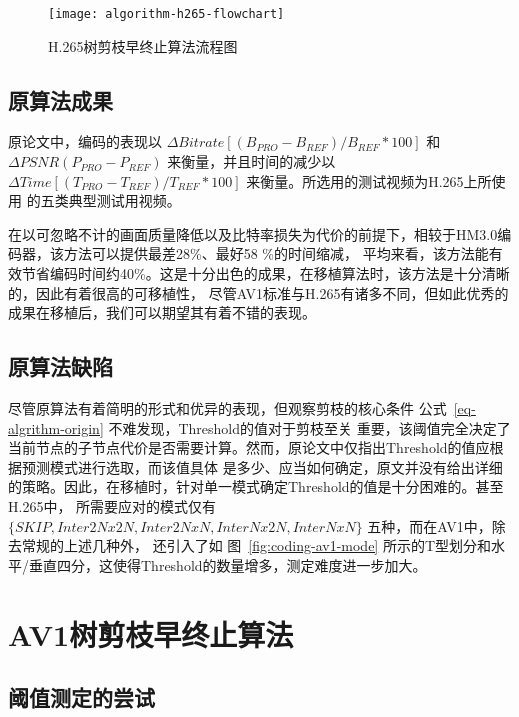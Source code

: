 \begin{figure}[H] %
  \centering
  \texttt{[image: algorithm-h265-flowchart]}
  \caption{H.265树剪枝早终止算法流程图}
  \label{fig:algorithm-h265-flowchart}
\end{figure}

\subsection{原算法成果}

原论文中，编码的表现以 $\Delta Bitrate[ (B_{PRO} - B_{REF})/B_{REF} * 100 ]$ 和 $ \Delta PSNR(P_{PRO} - P_{REF})$ 
来衡量，并且时间的减少以 $ \Delta Time[ (T_{PRO} - T_{REF})/T_{REF} * 100 ]$ 来衡量。所选用的测试视频为H.265上所使用
的五类典型测试用视频。

在以可忽略不计的画面质量降低以及比特率损失为代价的前提下，相较于HM3.0编码器，该方法可以提供最差28\%、最好58 \%的时间缩减，
平均来看，该方法能有效节省编码时间约40\%。这是十分出色的成果，在移植算法时，该方法是十分清晰的，因此有着很高的可移植性，
尽管AV1标准与H.265有诸多不同，但如此优秀的成果在移植后，我们可以期望其有着不错的表现。

\subsection{原算法缺陷}

尽管原算法有着简明的形式和优异的表现，但观察剪枝的核心条件 公式~\ref{eq-algrithm-origin} 不难发现，Threshold的值对于剪枝至关
重要，该阈值完全决定了当前节点的子节点代价是否需要计算。然而，原论文中仅指出Threshold的值应根据预测模式进行选取，而该值具体
是多少、应当如何确定，原文并没有给出详细的策略。因此，在移植时，针对单一模式确定Threshold的值是十分困难的。甚至H.265中，
所需要应对的模式仅有 $\{ SKIP, Inter2Nx2N, Inter2NxN, InterNx2N, InterNxN \} $ 五种，而在AV1中，除去常规的上述几种外，
还引入了如 图~\ref{fig:coding-av1-mode} 所示的T型划分和水平/垂直四分，这使得Threshold的数量增多，测定难度进一步加大。

\section{AV1树剪枝早终止算法}

\subsection{阈值测定的尝试}
\label{sec:algorithm-threshold-try}

